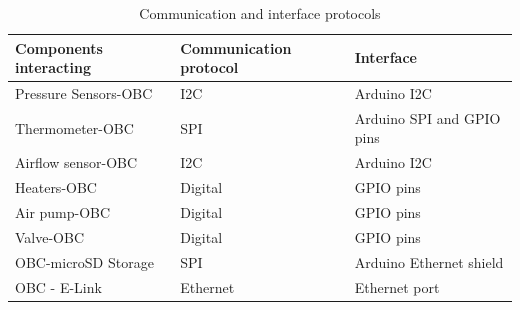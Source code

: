 \documentclass[a4paper,12pt,twoside]{article}
\begin{document}
\begin{enumerate}[label=(\alph*)]
\begin{table}[H]
\centering
\begin{tabular}{lll}
Components interacting & Communication protocol & Interface                 \\ \hline
Pressure Sensors-OBC   & I2C                    & Arduino I2C \\
Thermometer-OBC        & SPI                    & Arduino SPI and GPIO pins \\
Airflow sensor-OBC     & I2C                    & Arduino I2C \\
Heaters-OBC            & Digital                & GPIO pins \\
Air pump-OBC           & Digital                & GPIO pins \\
Valve-OBC              & Digital                & GPIO pins                 \\
OBC-microSD Storage    & SPI                    & Arduino Ethernet shield   \\
OBC - E-Link           & Ethernet               & Ethernet port            
\end{tabular}%
\caption{Communication and interface protocols}
\label{tab:comIntpro}
\end{table}


\end{enumerate}
\end{document}
